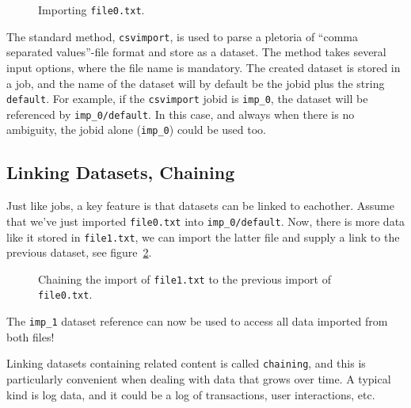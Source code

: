 \documentclass[a4paper]{article}
\begin{document}
\begin{figure}[h!]
  \begin{center}
    
    \caption{Importing \texttt{file0.txt}.}
    \label{fig:dataset_csvimport}
  \end{center}
\end{figure}

\noindent The standard method, \texttt{csvimport}, is used to parse a
pletoria of ``comma separated values''-file format and store as a
dataset.  The method takes several input options, where the file name
is mandatory.  The created dataset is stored in a job, and the name of
the dataset will by default be the jobid plus the string
\texttt{default}.  For example, if the \texttt{csvimport} jobid is
\texttt{imp\_0}, the dataset will be referenced by
\texttt{imp\_0/default}.  In this case, and always when there is no
ambiguity, the jobid alone (\texttt{imp\_0}) could be used too.

\clearpage




\subsection{Linking Datasets, Chaining}

Just like jobs, a key feature is that datasets can be linked to
eachother.  Assume that we've just imported \texttt{file0.txt} into
\texttt{imp\_0/default}.  Now, there is more data like it stored in
\texttt{file1.txt}, we can import the latter file and supply a link to
the previous dataset, see figure~\ref{fig:dataset_csvimport_chain}.

\begin{figure}[h!]
  \begin{center}
    
    \caption{Chaining the import of \texttt{file1.txt} to the previous
      import of \texttt{file0.txt}.}
    \label{fig:dataset_csvimport_chain}
  \end{center}
\end{figure}

\noindent The \texttt{imp\_1} dataset reference can now be used to
access all data imported from both files!

Linking datasets containing related content is called
\texttt{chaining}, and this is particularly convenient when dealing
with data that grows over time.  A typical kind is log data, and it
could be a log of transactions, user interactions, etc.
\end{document}
